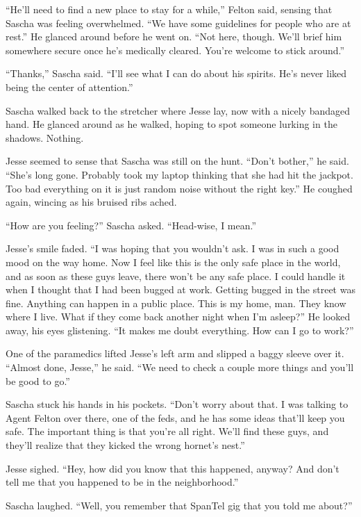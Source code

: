 \documentclass[12pt]{book}
\begin{document}
``He'll need to find a new place to stay for a while,'' Felton said, sensing that Sascha was feeling overwhelmed.  ``We have some guidelines for people who are at rest.''  He glanced around before he went on. ``Not here, though.  We'll brief him somewhere secure once he's medically cleared.  You're welcome to stick around.''

``Thanks,'' Sascha said.  ``I'll see what I can do about his spirits.  He's never liked being the center of attention.''

Sascha walked back to the stretcher where Jesse lay, now with a nicely bandaged hand.  He glanced around as he walked, hoping to spot someone lurking in the shadows.  Nothing.

Jesse seemed to sense that Sascha was still on the hunt.  ``Don't bother,'' he said.  ``She's long gone.  Probably took my laptop thinking that she had hit the jackpot.  Too bad everything on it is just random noise without the right key.''  He coughed again, wincing as his bruised ribs ached.

``How are you feeling?'' Sascha asked.  ``Head-wise, I mean.''

Jesse's smile faded.  ``I was hoping that you wouldn't ask.  I was in such a good mood on the way home.  Now I feel like this is the only safe place in the world, and as soon as these guys leave, there won't be any safe place.  I could handle it when I thought that I had been bugged at work.  Getting bugged in the street was fine.  Anything can happen in a public place.  This is my home, man.  They know where I live.  What if they come back another night when I'm asleep?''  He looked away, his eyes glistening.  ``It makes me doubt everything.  How can I go to work?''

One of the paramedics lifted Jesse's left arm and slipped a baggy sleeve over it.  ``Almost done, Jesse,'' he said.  ``We need to check a couple more things and you'll be good to go.''

Sascha stuck his hands in his pockets.  ``Don't worry about that.  I was talking to Agent Felton over there, one of the feds, and he has some ideas that'll keep you safe.  The important thing is that you're all right.  We'll find these guys, and they'll realize that they kicked the wrong hornet's nest.''

Jesse sighed.  ``Hey, how did you know that this happened, anyway?  And don't tell me that you happened to be in the neighborhood.''

Sascha laughed.  ``Well, you remember that SpanTel gig that you told me about?''
\end{document}
